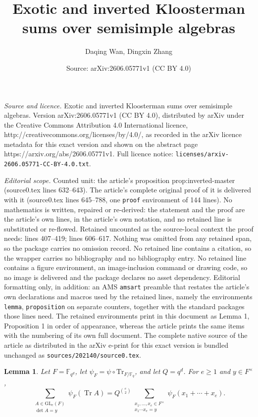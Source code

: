 \documentclass[10pt,a4paper]{amsart}
\title{Exotic and inverted Kloosterman sums over semisimple algebras}
\author{Daqing Wan, Dingxin Zhang}
\date{Source: arXiv:2606.05771v1 (CC BY 4.0)}
\newtheorem{lemma}{Lemma}
\newcommand{\Trace}{\mathrm{Tr}}
\renewcommand{\geq}{\geqslant}
\begin{document}
\maketitle

\noindent\emph{Source and licence.} Exotic and inverted Kloosterman sums over semisimple algebras. Version arXiv:2606.05771v1 (CC BY 4.0), distributed by arXiv under the Creative Commons Attribution 4.0 International licence, http://creativecommons.org/licenses/by/4.0/, as recorded in the arXiv licence metadata for this exact version and shown on the abstract page https://arxiv.org/abs/2606.05771v1. Full licence notice: \texttt{licenses/arxiv-2606.05771-CC-BY-4.0.txt}.\par\smallskip

\noindent\textit{Editorial scope.} Counted unit: the article's proposition prop:inverted-master (source0.tex lines 632--643). The article's complete original proof of it is delivered with it (source0.tex lines 645--788, one \texttt{proof} environment of 144 lines). No mathematics is written, repaired or re-derived: the statement and the proof are the article's own lines, in the article's own notation, and no retained line is substituted or re-flowed.  Retained uncounted as the source-local context the proof needs: lines 407--419; lines 606--617.  Nothing was omitted from any retained span, so the package carries no omission record.  No retained line contains a citation, so the wrapper carries no bibliography and no bibliography entry.  No retained line contains a figure environment, an image-inclusion command or drawing code, so no image is delivered and the package declares no asset dependency.  Editorial formatting only, in addition: an AMS \texttt{amsart} preamble that restates the article's own declarations and macros used by the retained lines, namely the environments \texttt{lemma}, \texttt{proposition} on separate counters, together with the standard packages those lines need.  The retained environments print in this document as Lemma 1, Proposition 1 in order of appearance, whereas the article prints the same items with the numbering of its own full document.  The complete native source of the article as distributed in the arXiv e-print for this exact version is bundled unchanged as \texttt{sources/202140/source0.tex}.
\begin{lemma}\label{lem:matrix-reduction}
Let \(F=\mathbb{F}_{q^d}\), let
\(\psi_F=\psi\circ\Trace_{F/\mathbb{F}_q}\), and let
\(Q=q^d\).  For \(e\geq 1\) and \(y\in F^\times\),
\begin{equation}\label{eq:matrix-reduction}
\sum_{\substack{A\in\mathrm{GL}_e(F)\\ \det A=y}}
\psi_F(\operatorname{Tr}A)
=
Q^{\binom{e}{2}}
\sum_{\substack{x_1,\ldots,x_e\in F^\times\\  x_1\cdots x_e=y}}
\psi_F(x_1+\cdots+x_e).
\end{equation}
\end{lemma}
\end{document}
